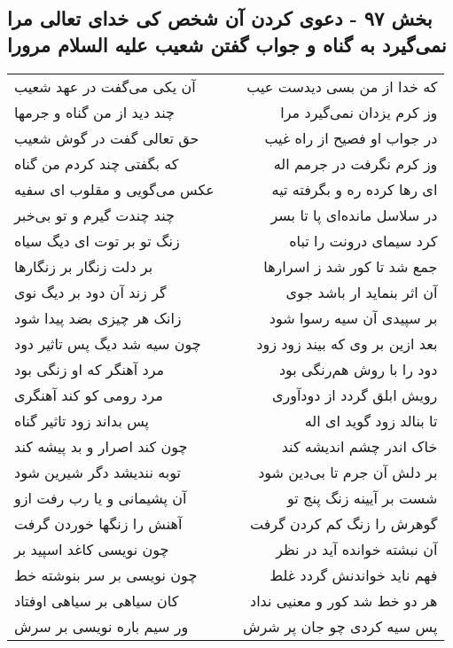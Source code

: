 \begin{center}
\section*{بخش ۹۷ - دعوی کردن آن شخص کی خدای تعالی مرا نمی‌گیرد به گناه و جواب گفتن شعیب علیه السلام مرورا}
\label{sec:sh097}
\begin{longtable}{l p{0.5cm} r}
آن یکی می‌گفت در عهد شعیب
&&
که خدا از من بسی دیدست عیب
\\
چند دید از من گناه و جرمها
&&
وز کرم یزدان نمی‌گیرد مرا
\\
حق تعالی گفت در گوش شعیب
&&
در جواب او فصیح از راه غیب
\\
که بگفتی چند کردم من گناه
&&
وز کرم نگرفت در جرمم اله
\\
عکس می‌گویی و مقلوب ای سفیه
&&
ای رها کرده ره و بگرفته تیه
\\
چند چندت گیرم و تو بی‌خبر
&&
در سلاسل مانده‌ای پا تا بسر
\\
زنگ تو بر توت ای دیگ سیاه
&&
کرد سیمای درونت را تباه
\\
بر دلت زنگار بر زنگارها
&&
جمع شد تا کور شد ز اسرارها
\\
گر زند آن دود بر دیگ نوی
&&
آن اثر بنماید ار باشد جوی
\\
زانک هر چیزی بضد پیدا شود
&&
بر سپیدی آن سیه رسوا شود
\\
چون سیه شد دیگ پس تاثیر دود
&&
بعد ازین بر وی که بیند زود زود
\\
مرد آهنگر که او زنگی بود
&&
دود را با روش هم‌رنگی بود
\\
مرد رومی کو کند آهنگری
&&
رویش ابلق گردد از دودآوری
\\
پس بداند زود تاثیر گناه
&&
تا بنالد زود گوید ای اله
\\
چون کند اصرار و بد پیشه کند
&&
خاک اندر چشم اندیشه کند
\\
توبه نندیشد دگر شیرین شود
&&
بر دلش آن جرم تا بی‌دین شود
\\
آن پشیمانی و یا رب رفت ازو
&&
شست بر آیینه زنگ پنج تو
\\
آهنش را زنگها خوردن گرفت
&&
گوهرش را زنگ کم کردن گرفت
\\
چون نویسی کاغد اسپید بر
&&
آن نبشته خوانده آید در نظر
\\
چون نویسی بر سر بنوشته خط
&&
فهم ناید خواندنش گردد غلط
\\
کان سیاهی بر سیاهی اوفتاد
&&
هر دو خط شد کور و معنیی نداد
\\
ور سیم باره نویسی بر سرش
&&
پس سیه کردی چو جان پر شرش
\\

\end{longtable}
\end{center}
